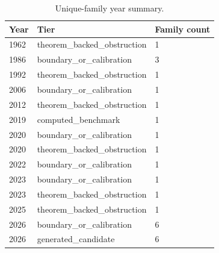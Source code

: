 \begin{table}[h]
\centering
\caption{Unique-family year summary.}
\label{tab:family-year-summary}
\small
\renewcommand{\arraystretch}{1.18}
\begin{tabular}{|p{}|p{}|p{}|}
\hline
\centering\textbf{Year} & \centering\textbf{Tier} & \centering\arraybackslash\textbf{Family count} \\
\hline
1962 & theorem\_\allowbreak{}backed\_\allowbreak{}obstruction & 1 \\
1986 & boundary\_\allowbreak{}or\_\allowbreak{}calibration & 3 \\
1992 & theorem\_\allowbreak{}backed\_\allowbreak{}obstruction & 1 \\
2006 & boundary\_\allowbreak{}or\_\allowbreak{}calibration & 1 \\
2012 & theorem\_\allowbreak{}backed\_\allowbreak{}obstruction & 1 \\
2019 & computed\_\allowbreak{}benchmark & 1 \\
2020 & boundary\_\allowbreak{}or\_\allowbreak{}calibration & 1 \\
2020 & theorem\_\allowbreak{}backed\_\allowbreak{}obstruction & 1 \\
2022 & boundary\_\allowbreak{}or\_\allowbreak{}calibration & 1 \\
2023 & boundary\_\allowbreak{}or\_\allowbreak{}calibration & 1 \\
2023 & theorem\_\allowbreak{}backed\_\allowbreak{}obstruction & 1 \\
2025 & theorem\_\allowbreak{}backed\_\allowbreak{}obstruction & 1 \\
2026 & boundary\_\allowbreak{}or\_\allowbreak{}calibration & 6 \\
2026 & generated\_\allowbreak{}candidate & 6 \\
\hline
\end{tabular}
\end{table}
